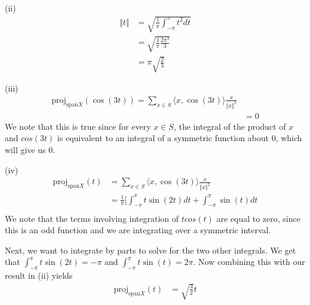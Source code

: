 \documentclass{article}
\newcommand{\inprod}[1]{\langle #1 \rangle}
\begin{document}
	(ii)
	\begin{align*}
	\Vert t \Vert &= \sqrt{\frac{1}{\pi} \int_{-\pi}^{\pi} t^2 dt} \\
	&= \sqrt{ \frac{1}{\pi} \frac{2 \pi^3}{3} } \\
	&= \pi \sqrt{ \frac{2}{3}}
	\end{align*}
	
	(iii)
	\begin{align*}
	\text{proj}_{\text{span} X}(\cos(3t)) = \sum_{x \in S} \inprod{x, \cos(3t)} \frac{x}{\Vert x \Vert^2} \\
	&= 0
	\end{align*}
	We note that this is true since for every $x \in S$, the integral of the product of $x$ and $cos(3t)$ is equivalent to an integral of a symmetric function about 0, which will give us 0. 
	
	(iv) 
	\begin{align*}
	\text{proj}_{\text{span} X}(t) &= \sum_{x \in S} \inprod{x, \cos(3t)} \frac{x}{\Vert x \Vert^2} \\
	&= \frac{1}{\pi}[\int_{-\pi}^{\pi} t \sin(2t) dt + \int_{-\pi}^{\pi} \sin(t) dt \\
	\end{align*}
	We note that the terms involving integration of $t cos(t)$ are equal to zero, since this is an odd function and we are integrating over a symmetric interval.
	
	Next, we want to integrate by parts to solve for the two other integrals. We get that $\int_{-\pi}^{\pi} t \sin(2t) = - \pi$ and $\int_{-\pi}^{\pi} t \sin(t) = 2\pi$. Now combining this with our result in (ii) yields
	\begin{align*}
	\text{proj}_{\text{span} X}(t) &= \sqrt{\frac{3}{2}}t  
	\end{align*}
	
\end{document}
